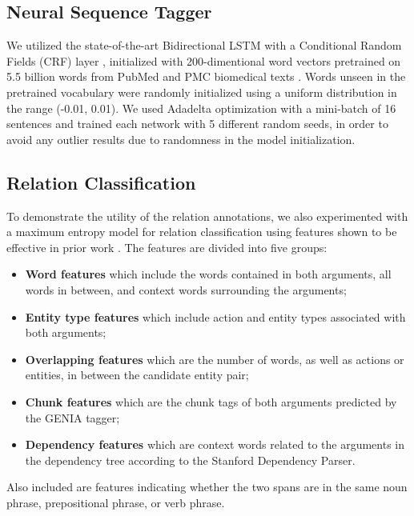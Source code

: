 \documentclass[11pt,a4paper]{article}
\begin{document}
\subsection{Neural Sequence Tagger}
We utilized the state-of-the-art Bidirectional LSTM with a Conditional Random Fields (CRF) layer \cite{ma2016end,lample2016neural,plank2016multilingual}, initialized with 200-dimentional word vectors
pretrained on 5.5 billion words from PubMed and PMC biomedical texts  \cite{moen2013distributional}. Words unseen in the pretrained vocabulary were randomly initialized using a uniform distribution in the range (-0.01, 0.01). We used Adadelta \cite{zeiler2012adadelta} optimization with a mini-batch of 16 sentences and trained each network with 5 different random seeds, in order to avoid any outlier results due to randomness in the model initialization.

\subsection{Relation Classification}
To demonstrate the utility of the relation annotations, we also experimented with a maximum entropy model for relation classification using features shown to be effective in prior work \cite{li2014incremental,guodong2005exploring,kambhatla2004combining}. The features are divided into five groups:
\begin{itemize}
    \vspace{-.1in}
    \item \textbf{Word features} which include the words contained in both arguments, all words in between, and context words surrounding the arguments;
    \vspace{-.1in}
     \item \textbf{Entity type features} which include action and entity types associated with both arguments; 
     \vspace{-.1in}
     \item \textbf{Overlapping features} which are the number of words, as well as actions or entities, in between the candidate entity pair; 
     \vspace{-.1in}
     \item \textbf{Chunk features} which are the chunk tags of both arguments predicted by the GENIA tagger; 
     \vspace{-.1in}
      \item \textbf{Dependency features} which are context words related to the arguments in the dependency tree according to the Stanford Dependency Parser. 
\end{itemize}
Also included are features indicating whether the two spans are in the same noun phrase, prepositional phrase, or verb phrase.
\end{document}
